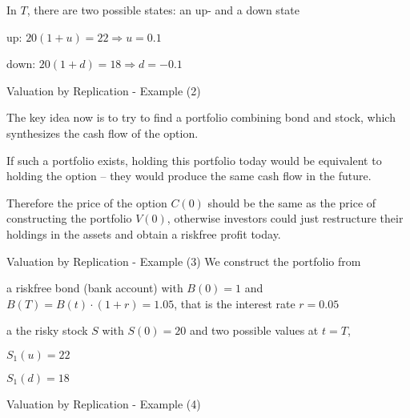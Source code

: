 	In $T$, there are two possible states: an up- and a down state










	up: $20 (1+u)=22 \Rightarrow u=0.1$


	down: $20 (1+d)=18 \Rightarrow d=-0.1$





{Valuation by Replication - Example (2)}






	The key idea now is to try to find a portfolio combining bond and
stock, which synthesizes the cash flow of the option.


	If such a portfolio exists, holding this portfolio today would be equivalent
to holding the option -- they would produce the same cash flow in
the future.


	Therefore the price of the option $C(0)$ should be the same
as the price of constructing the portfolio $V(0)$, otherwise investors
could just restructure their holdings in the assets and obtain a
riskfree profit today.





{Valuation by Replication - Example (3)}
We construct the portfolio from






	a riskfree bond (bank account) with $B(0)=1$ and $B(T)=B(t) \cdot (1+r) = 1.05$,
that is the interest rate $r=0.05$


	a the risky stock $S$ with $S(0) = 20$ and two
possible values at $t=T$,






	$S_1(u)=22$


	$S_1(d)=18$









{Valuation by Replication - Example (4)}


